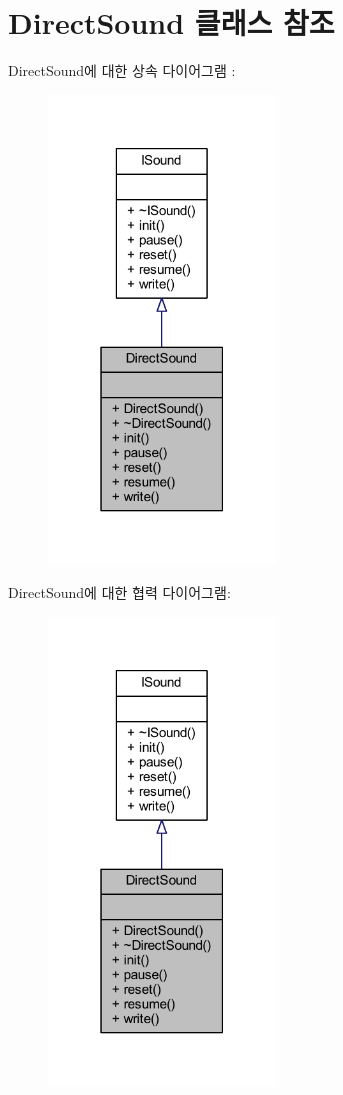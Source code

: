 \hypertarget{class_direct_sound}{}\section{Direct\+Sound 클래스 참조}
\label{class_direct_sound}


Direct\+Sound에 대한 상속 다이어그램 \+: \nopagebreak
\begin{figure}[H]
\begin{center}
\leavevmode
\includegraphics[width=171pt]{class_direct_sound__inherit__graph}
\end{center}
\end{figure}


Direct\+Sound에 대한 협력 다이어그램\+:\nopagebreak
\begin{figure}[H]
\begin{center}
\leavevmode
\includegraphics[width=171pt]{class_direct_sound__coll__graph}
\end{center}
\end{figure}
